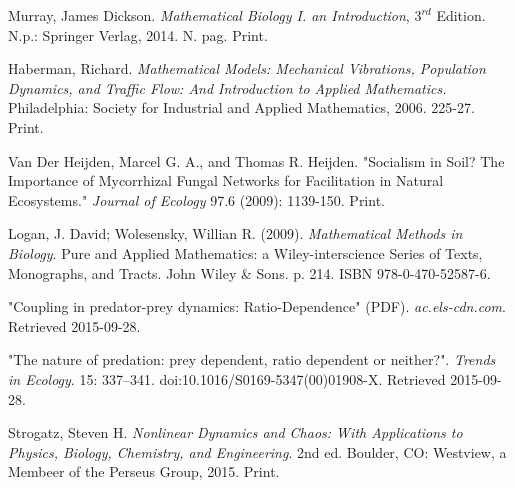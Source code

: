 \documentclass[11pt,a4paper]{scrartcl}
\theoremstyle{definition}
\begin{document}
\begin{thebibliography}{7}
 Murray, James Dickson. 
\emph{Mathematical Biology I. an Introduction}, $3^{rd}$ Edition.
N.p.: Springer Verlag, 2014. N. pag. Print.

 Haberman, Richard. \emph{Mathematical Models: Mechanical Vibrations, Population Dynamics, and Traffic Flow: And Introduction to Applied Mathematics.} Philadelphia: Society for Industrial and Applied Mathematics, 2006. 225-27. Print.

 Van Der Heijden, Marcel G. A., and Thomas R. Heijden. "Socialism in Soil? The Importance of Mycorrhizal Fungal Networks for Facilitation in Natural Ecosystems." \emph{Journal of Ecology} 97.6 (2009): 1139-150. Print.

 Logan, J. David; Wolesensky, Willian R. (2009). \emph{Mathematical Methods in Biology}. Pure and Applied Mathematics: a Wiley-interscience Series of Texts, Monographs, and Tracts. John Wiley \& Sons. p. 214. ISBN 978-0-470-52587-6.

 "Coupling in predator-prey dynamics: Ratio-Dependence" (PDF). \emph{ac.els-cdn.com}. Retrieved 2015-09-28.

"The nature of predation: prey dependent, ratio dependent or neither?". \emph{Trends in Ecology}. 15: 337–341. doi:10.1016/S0169-5347(00)01908-X. Retrieved 2015-09-28.

 Strogatz, Steven H. \emph{Nonlinear Dynamics and Chaos: With Applications to Physics, Biology, Chemistry, and Engineering}. 2nd ed. Boulder, CO: Westview, a Membeer of the Perseus Group, 2015. Print.
\end{thebibliography}
\end{document}
